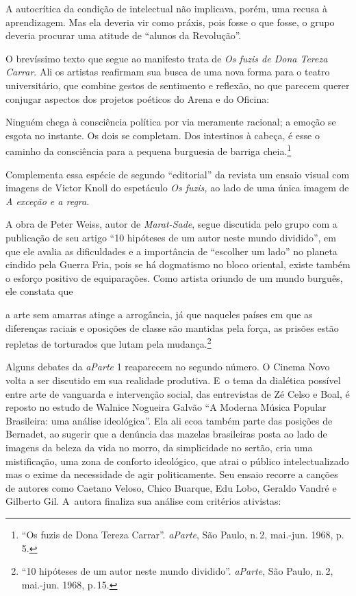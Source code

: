 A autocrítica da condição de intelectual não implicava, porém, uma
recusa à aprendizagem. Mas ela deveria vir como práxis, pois fosse o que
fosse, o grupo deveria procurar uma atitude de “alunos da Revolução”.

O brevíssimo texto que segue ao manifesto trata de {\it Os
fuzis de Dona Tereza Carrar}. Ali os artistas reafirmam sua busca de uma
nova forma para o teatro universitário, que combine gestos de sentimento
e reflexão, no que parecem querer conjugar aspectos dos projetos
poéticos do Arena e do Oficina:

\startblockquote
Ninguém chega à consciência política por via meramente racional; a
emoção se esgota no instante. Os dois se completam. Dos intestinos à
cabeça, é esse o caminho da consciência para a pequena burguesia de
barriga cheia.\footnote{“Os fuzis de Dona Tereza Carrar”. {\it aParte},
  São Paulo, n.\,2, mai.-jun. 1968, p.\,5.}
\stopblockquote

Complementa essa espécie de segundo “editorial” da revista um ensaio
visual com imagens de Victor Knoll do espetáculo {\it Os fuzis,} ao lado
de uma única imagem de {\it A exceção e a regra}.

A obra de Peter Weiss, autor de {\it Marat-Sade}, segue discutida pelo grupo
com a publicação de seu artigo “10 hipóteses de um autor neste mundo
dividido”, em que ele avalia as dificuldades e a importância de
“escolher um lado” no planeta cindido pela Guerra Fria, pois se há
dogmatismo no bloco oriental, existe também o esforço positivo de
equiparações. Como artista oriundo de um mundo burguês, ele constata que

\startblockquote
a arte sem amarras atinge a arrogância, já que naqueles países em que as
diferenças raciais e oposições de classe são mantidas pela força, as
prisões estão repletas de torturados que lutam pela mudança.\footnote{“10
  hipóteses de um autor neste mundo dividido”. {\it aParte}, São Paulo,
  n.\,2, mai.-jun. 1968, p.\,15.}
\stopblockquote

Alguns debates da {\it aParte} 1 reaparecem no segundo número. O
Cinema Novo volta a ser discutido em sua realidade produtiva. E~o tema
da dialética possível entre arte de vanguarda e intervenção social, das
entrevistas de Zé Celso e Boal, é reposto no estudo de Walnice Nogueira
Galvão “A Moderna Música Popular Brasileira: uma análise
ideológica”. Ela ali ecoa também parte das posições de Bernadet, ao
sugerir que a denúncia das mazelas brasileiras posta ao lado de imagens
da beleza da vida no morro, da simplicidade no sertão, cria uma
mistificação, uma zona de conforto ideológico, que atrai o público
intelectualizado mas o exime da necessidade de agir politicamente. Seu
ensaio recorre a canções de autores como Caetano Veloso, Chico Buarque,
Edu Lobo, Geraldo Vandré e Gilberto Gil. A~autora finaliza sua análise
com critérios ativistas:

